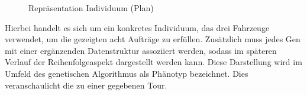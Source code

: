 \begin{figure}[ht!]
	\centering
      \hspace{0.5cm}
      \hspace{0.5cm}
      \caption{Repräsentation Individuum (Plan)}
      \label{fig:Repraesentation234}
\end{figure}

Hierbei handelt es sich um ein konkretes Individuum, das drei Fahrzeuge verwendet, um die gezeigten acht Aufträge zu erfüllen. Zusätzlich muss jedes Gen mit einer ergänzenden Datenstruktur assoziiert werden, sodass im späteren Verlauf der Reihenfolgeaspekt dargestellt werden kann. Diese Darstellung wird im Umfeld des genetischen Algorithmus als Phänotyp bezeichnet. Dies veranschaulicht die  zu einer gegebenen Tour.

